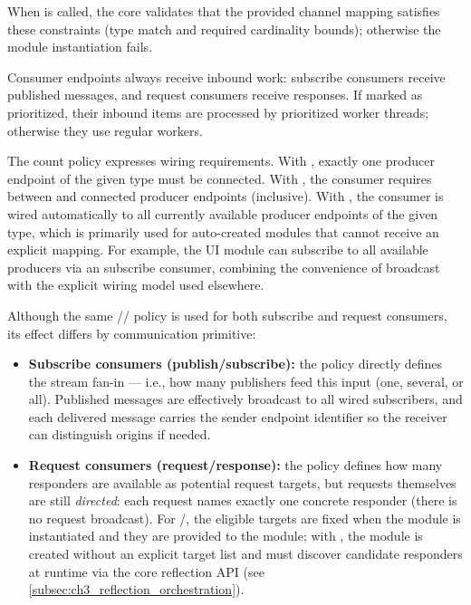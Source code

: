 When  is called, the core validates that the provided channel mapping satisfies these constraints (type match and required cardinality bounds); otherwise the module instantiation fails.

Consumer endpoints always receive inbound work: subscribe consumers receive published messages, and request consumers receive responses. If marked as prioritized, their inbound items are processed by prioritized worker threads; otherwise they use regular workers.

The count policy expresses wiring requirements. With , exactly one producer endpoint of the given type must be connected. With , the consumer requires between  and  connected producer endpoints (inclusive). With , the consumer is wired automatically to all currently available producer endpoints of the given type, which is primarily used for auto-created modules that cannot receive an explicit mapping. For example, the UI module can subscribe to all available  producers via an  subscribe consumer, combining the convenience of broadcast with the explicit wiring model used elsewhere.

Although the same // policy is used for both subscribe and request consumers, its effect differs by communication primitive:
\begin{itemize}
    \item \textbf{Subscribe consumers (publish/subscribe):} the policy directly defines the stream fan-in --- i.e., how many publishers feed this input (one, several, or all). Published messages are effectively broadcast to all wired subscribers, and each delivered message carries the sender endpoint identifier so the receiver can distinguish origins if needed.
    \item \textbf{Request consumers (request/response):} the policy defines how many responders are available as potential request targets, but requests themselves are still \emph{directed}: each request names exactly one concrete responder (there is no request broadcast). For /, the eligible targets are fixed when the module is instantiated and they are provided to the module; with , the module is created without an explicit target list and must discover candidate responders at runtime via the core reflection API (see \autoref{subsec:ch3_reflection_orchestration}).
\end{itemize}

